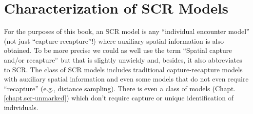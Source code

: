 \section{Characterization of SCR Models}
\label{modeling.sec.characterization}

For the purposes of this book, an SCR model is any ``individual
encounter model'' (not just ``capture-recapture''!) where auxiliary
spatial information is also obtained. To be more precise we could as
well use the term ``Spatial capture and/or recapture'' but that is
slightly unwieldy and, besides, it also abbreviates to SCR. The class
of SCR models includes traditional capture-recapture models with
auxiliary spatial information and even some
models that do not even require ``recapture'' (e.g., distance
sampling).  There is even a class of models (Chapt. \ref{chapt.scr-unmarked})
which don't require capture or unique
identification of individuals.

